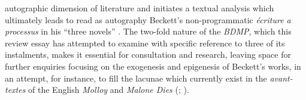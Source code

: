 \begin{paper}
autographic dimension of literature and initiates a textual analysis
which ultimately leads to read as autography Beckett's non-programmatic
\emph{écriture a processus} in his ``three novels'' \citep{hay_troisieme_1986}. The
two-fold nature of the \emph{BDMP}, which this review essay has
attempted to examine with specific reference to three of its
instalments, makes it essential for consultation and research, leaving
space for further enquiries focusing on the exogenesis and epigenesis of
Beckett's works, in an attempt, for instance, to fill the lacunae which
currently exist in the \emph{avant-textes} of the English \emph{Molloy}
and \emph{Malone Dies} (\citealt[55-61]{oreilly_making_2017}; \citealt[56--58]{van_hulle_making_2017}).

\begin{flushleft}
  
\end{flushleft}

\end{paper}